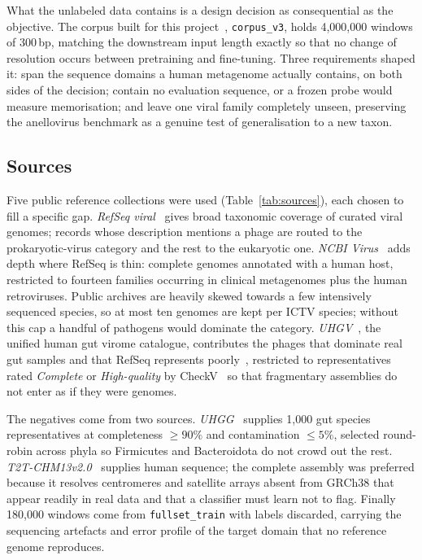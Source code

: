 \documentclass[10pt,twocolumn,a4paper]{article}
\begin{document}
What the unlabeled data contains is a design decision as consequential as the
objective. The corpus built for this project~\cite{grigolin2026corpus},
\texttt{corpus\_v3}, holds 4{,}000{,}000 windows of 300\,bp, matching the
downstream input length exactly so that no change of resolution occurs between
pretraining and fine-tuning. Three requirements shaped it: span the sequence
domains a human metagenome actually contains, on both sides of the decision;
contain no evaluation sequence, or a frozen probe would measure memorisation; and
leave one viral family completely unseen, preserving the anellovirus benchmark as
a genuine test of generalisation to a new taxon.

\subsection{Sources}

Five public reference collections were used (Table~\ref{tab:sources}), each
chosen to fill a specific gap. \emph{RefSeq viral}~\cite{oleary2016refseq} gives
broad taxonomic coverage of curated viral genomes; records whose description
mentions a phage are routed to the prokaryotic-virus category and the rest to the
eukaryotic one. \emph{NCBI Virus}~\cite{hatcher2017ncbivirus} adds depth where RefSeq is thin: complete genomes annotated with a human host, restricted to fourteen
families occurring in clinical metagenomes plus the human retroviruses. Public
archives are heavily skewed towards a few intensively sequenced species, so at
most ten genomes are kept per ICTV species; without this cap a handful of
pathogens would dominate the category. \emph{UHGV}~\cite{camargo2025uhgv}, the
unified human gut virome catalogue, contributes the phages that dominate real gut
samples and that RefSeq represents poorly~\cite{shkoporov2019phages}, restricted
to representatives rated \emph{Complete} or \emph{High-quality} by
CheckV~\cite{nayfach2021checkv} so that fragmentary assemblies do not enter as if
they were genomes.

The negatives come from two sources. \emph{UHGG}~\cite{almeida2021uhgg} supplies
1{,}000 gut species representatives at completeness $\ge90\%$ and contamination
$\le5\%$, selected round-robin across phyla so Firmicutes and Bacteroidota do not
crowd out the rest. \emph{T2T-CHM13v2.0}~\cite{nurk2022t2t} supplies human
sequence; the complete assembly was preferred because it resolves centromeres and
satellite arrays absent from GRCh38 that appear readily in real data and that a
classifier must learn not to flag. Finally 180{,}000 windows come from
\texttt{fullset\_train} with labels discarded, carrying the sequencing artefacts
and error profile of the target domain that no reference genome reproduces.
\end{document}
